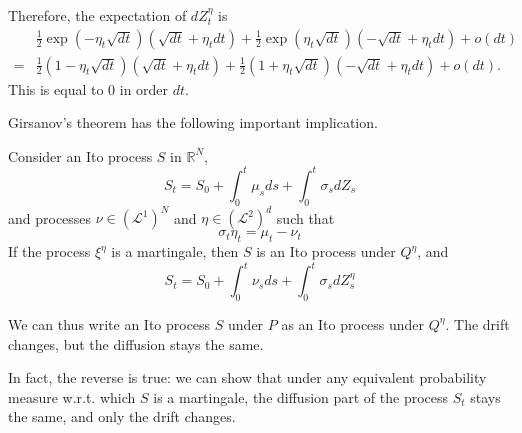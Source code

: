\documentclass[\topdir/lecture\_notes.tex]{subfiles}
\begin{document}
Therefore, the expectation of \(d Z_{t}^{\eta}\) is
\begin{equation*}
\begin{aligned}
& \frac{1}{2} \exp \left(-\eta_{t} \sqrt{d t}\right)\left(\sqrt{d t}+\eta_{t} d t\right)+\frac{1}{2} \exp \left(\eta_{t} \sqrt{d t}\right)\left(-\sqrt{d t}+\eta_{t} d t\right)+o(d t) \\
= & \frac{1}{2}\left(1-\eta_{t} \sqrt{d t}\right)\left(\sqrt{d t}+\eta_{t} d t\right)+\frac{1}{2}\left(1+\eta_{t} \sqrt{d t}\right)\left(-\sqrt{d t}+\eta_{t} d t\right)+o(d t) .
\end{aligned}
\end{equation*}
This is equal to 0 in order \(dt\).

Girsanov's theorem has the following important implication.

\begin{proposition}\label{prop: prop_271}
Consider an Ito process \(S\) in \(\mathbb{R}^{N}\),
\begin{equation*}
S_{t}=S_{0}+\int_{0}^{t} \mu_{s} d s+\int_{0}^{t} \sigma_{s} d Z_{s}
\end{equation*}
and processes \(\nu \in\left(\mathcal{L}^{1}\right)^{N}\) and \(\eta \in\left(\mathcal{L}^{2}\right)^{d}\) such that
\begin{equation*}
\sigma_{t} \eta_{t}=\mu_{t}-\nu_{t}
\end{equation*}
If the process \(\xi^{\eta}\) is a martingale, then \(S\) is an Ito process under \(Q^{\eta}\), and
\begin{equation*}
S_{t}=S_{0}+\int_{0}^{t} \nu_{s} d s+\int_{0}^{t} \sigma_{s} d Z_{s}^{\eta}
\end{equation*}
\end{proposition}
We can thus write an Ito process \(S\) under \(P\) as an Ito process under \(Q^{\eta}\). The drift changes, but the diffusion stays the same.

In fact, the reverse is true: we can show that under any equivalent probability measure w.r.t. which \(S\) is a martingale, the diffusion part of the process \(S_{t}\) stays the same, and only the drift changes.
\end{document}
